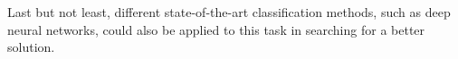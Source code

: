 \documentclass{article}
\begin{document}
Last but not least, different state-of-the-art classification methods, such as deep neural networks, could also be applied to this task in searching for a better solution.







%
%
%
%
\end{document}
